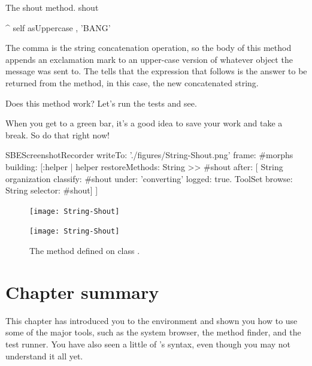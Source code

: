 \documentclass[a4paper,10pt,twoside]{book}
\begin{document}
\begin{method}[shout]{The shout method.}
shout

    ^ self asUppercase , 'BANG'
\end{method}

The comma is the string concatenation operation, so the body of this method appends an exclamation mark to an upper-case version of whatever  object the  message was sent to.
The \ct{^} tells \sq that the expression that follows is the answer to be returned from the method, in this case, the new concatenated string.

Does this method work?
Let's run the tests and see.

When you get to a green bar\footnotemark, it's a good idea to save your work and take a break.
So do that right now!

\begin{ExecuteSmalltalkScript}
SBEScreenshotRecorder writeTo: './figures/String-Shout.png' frame: #morphs building: [:helper |
	helper restoreMethods: {String >> #shout} after: [
		String organization classify: #shout under: 'converting' logged: true.
		ToolSet browse: String selector: #shout]
]
\end{ExecuteSmalltalkScript}
\begin{figure}[hbt]
\ifluluelse
	{\centerline{\texttt{[image: String-Shout]}}}
	{\centerline{\texttt{[image: String-Shout]}}}
\caption{The  method defined on class .
\label{fig:String-shout}}
\end{figure}

\section{Chapter summary}
This chapter has introduced you to the \sq environment and shown you how to use some of the major tools, such as the system browser, the method finder, and the test runner.
You have also seen a little of \sq's syntax, even though you may not understand it all yet.
\end{document}
